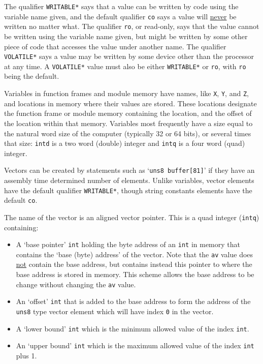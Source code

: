 \documentclass[12pt]{article}
\begin{document}
The qualifier {\tt *WRITABLE*} says that a value can be written by code
using the variable name given,
and the default qualifier {\tt co}
says a value will \underline{never} be written
no matter what.
The qualifier {\tt ro}, or read-only, says that
the value cannot be written using the variable name given, but might be
written by some other piece of code that accesses the value under another
name.
The qualifier {\tt *VOLATILE*} says a value may be
written by some device other than the processor at any time.
A {\tt *VOLATILE*} value must also be either {\tt *WRITABLE*}
or {\tt ro}, with {\tt ro} being the default.

Variables in function frames and module memory
have names, like {\tt X}, {\tt Y}, and {\tt Z},
and locations in memory where their values are stored.
These locations designate the
function frame or module memory containing the location,
and the offset of the location within that memory.
Variables most frequently
have a size equal to the natural
word size of the computer (typically 32 or 64 bits), or
several times that size: {\tt intd} is a two word (double) integer
and {\tt intq} is a four word (quad) integer.

Vectors can be created by statements such as `{\tt uns8 buffer[81]}'
if they have an assembly time determined number of elements.
Unlike variables, vector elements have the default qualifier
{\tt *WRITABLE*}, though string constants elements have the
default {\tt co}.

The name of the vector is an aligned vector pointer.  This is a
quad integer ({\tt intq}) containing:
\begin{itemize}
\item A `base pointer' {\tt int} holding the byte address
of an {\tt int} in memory
that contains the `base (byte) address' of the vector.
Note that the {\tt av} value does \underline{not} contain
the base address, but contains instead this pointer to where
the base address is stored in memory.  This scheme allows
the base address to be change without changing the {\tt av} value.
\item An `offset' {\tt int} that is added to the base address
to form the address of the {\tt uns8} type vector element
which will have index {\tt 0} in the vector.
\item A `lower bound' {\tt int} which is the minimum allowed
value of the index {\tt int}.
\item An `upper bound' {\tt int} which is the maximum allowed
value of the index {\tt int} plus 1.
\end{itemize}
\end{document}

